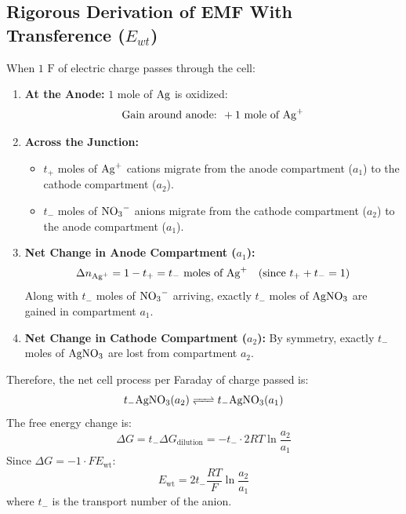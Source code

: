 \subsection{Rigorous Derivation of EMF With Transference ($E_{wt}$)}
When $1\text{ F}$ of electric charge passes through the cell:
\begin{enumerate}[leftmargin=*]
    \item \textbf{At the Anode:} $1\text{ mole}$ of $\ce{Ag}$ is oxidized:
    \begin{equation}
        \text{Gain around anode: } +1\text{ mole of } \ce{Ag+}
    \end{equation}
    \item \textbf{Across the Junction:}
    \begin{itemize}
        \item $t_+$ moles of $\ce{Ag+}$ cations migrate from the anode compartment ($a_1$) to the cathode compartment ($a_2$).
        \item $t_-$ moles of $\ce{NO3-}$ anions migrate from the cathode compartment ($a_2$) to the anode compartment ($a_1$).
    \end{itemize}
    \item \textbf{Net Change in Anode Compartment ($a_1$):}
    \begin{equation}
        \Delta n_{\ce{Ag+}} = 1 - t_+ = t_- \text{ moles of } \ce{Ag+} \quad (\text{since } t_+ + t_- = 1)
    \end{equation}
    Along with $t_-$ moles of $\ce{NO3-}$ arriving, exactly $t_-$ moles of $\ce{AgNO3}$ are gained in compartment $a_1$.
    \item \textbf{Net Change in Cathode Compartment ($a_2$):}
    By symmetry, exactly $t_-$ moles of $\ce{AgNO3}$ are lost from compartment $a_2$.
\end{enumerate}
Therefore, the net cell process per Faraday of charge passed is:
\begin{equation}
    t_- \ce{AgNO3}(a_2) \ce{<=>} t_- \ce{AgNO3}(a_1)
\end{equation}
The free energy change is:
\begin{equation}
    \Delta G = t_- \Delta G_{\text{dilution}} = -t_- \cdot 2RT \ln \frac{a_2}{a_1}
\end{equation}
Since $\Delta G = -1 \cdot F E_{\text{wt}}$:
\begin{equation}
    \boxed{E_{\text{wt}} = 2 t_- \frac{RT}{F} \ln \frac{a_2}{a_1}}
\end{equation}
where $t_-$ is the transport number of the anion.

